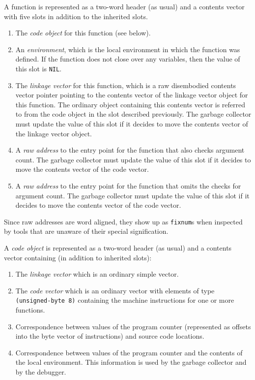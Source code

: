 A function is represented as a two-word header (as usual) and a
contents vector with five slots in addition to the inherited slots.

\begin{enumerate}
\item The \emph{code object} for this function (see below).
\item An \emph{environment}, which is the local environment in which
  the function was defined. If the function does not close over any
  variables, then the value of this slot is \texttt{NIL}.
\item The \emph{linkage vector} for this function, which is a raw
  disembodied contents vector pointer pointing to the contents vector
  of the linkage vector object for this function.  The ordinary \cl{}
  object containing this contents vector is referred to from the code
  object in the slot described previously.  The garbage collector must
  update the value of this slot if it decides to move the contents
  vector of the linkage vector object.
\item A \emph{raw address} to the entry point for the function that
  also checks argument count.  The garbage collector must update the
  value of this slot if it decides to move the contents vector of the
  code vector.
\item A \emph{raw address} to the entry point for the function that
  omits the checks for argument count.  The garbage collector must
  update the value of this slot if it decides to move the contents
  vector of the code vector.
\end{enumerate}

Since raw addresses are word aligned, they show up as \texttt{fixnum}s
when inspected by tools that are unaware of their special
signification.  

A \emph{code object} is represented as a two-word header (as usual)
and a contents vector containing (in addition to inherited slots):

\begin{enumerate}
\item The \emph{linkage vector} which is an ordinary \cl{} simple
  vector.
\item The \emph{code vector} which is an ordinary \cl{} vector with
  elements of type \texttt{(unsigned-byte 8)} containing the machine
  instructions for one or more functions.
\item Correspondence between values of the program counter
  (represented as offsets into the byte vector of instructions) and
  source code locations.  
\item Correspondence between values of the program counter and the
  contents of the local environment.  This information is used by the
  garbage collector and by the debugger. 
\end{enumerate}

